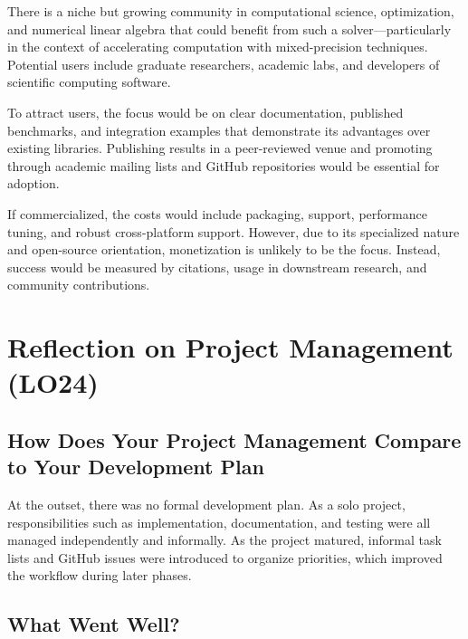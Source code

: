 \documentclass{article}
\begin{document}
There is a niche but growing community in computational science, optimization,
and numerical linear algebra that could benefit from such a solver—particularly
in the context of accelerating computation with mixed-precision techniques.
Potential users include graduate researchers, academic labs, and developers of
scientific computing software.

To attract users, the focus would be on clear documentation, published
benchmarks, and integration examples that demonstrate its advantages over
existing libraries. Publishing results in a peer-reviewed venue and promoting
through academic mailing lists and GitHub repositories would be essential for
adoption.

If commercialized, the costs would include packaging, support, performance
tuning, and robust cross-platform support. However, due to its specialized
nature and open-source orientation, monetization is unlikely to be the focus.
Instead, success would be measured by citations, usage in downstream research,
and community contributions.


\section{Reflection on Project Management (LO24)}


\subsection{How Does Your Project Management Compare to Your Development Plan}


At the outset, there was no formal development plan. As a solo project,
responsibilities such as implementation, documentation, and testing were all
managed independently and informally. As the project matured, informal task
lists and GitHub issues were introduced to organize priorities, which improved
the workflow during later phases.

\subsection{What Went Well?}
\end{document}
